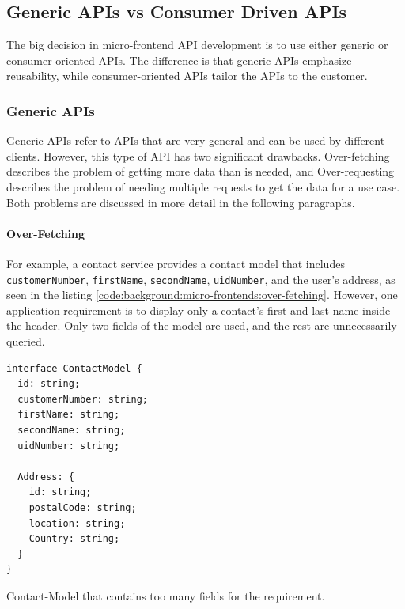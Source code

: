 \subsection{Generic APIs vs Consumer Driven APIs}\label{subsection:background:micro-frontend:generic-vs-consumer-driven-apis}

The big decision in micro-frontend \ac{API} development is to use either generic or consumer-oriented \acp{API}. The difference is that generic \acp{API} emphasize reusability, while consumer-oriented \acp{API} tailor the \acp{API} to the customer.

\subsubsection{Generic \acp{API}}\label{subsubsection:background:micro-frontend:generic-vs-consumer-driven-apis:generic-apis}

Generic \acp{API} refer to \acp{API} that are very general and can be used by different clients. However, this type of \ac{API} has two significant drawbacks. Over-fetching describes the problem of getting more data than is needed, and Over-requesting describes the problem of needing multiple requests to get the data for a use case. Both problems are discussed in more detail in the following paragraphs. \cite{misc:2019:leitner:background:micro-frontends:backend-for-frontends}

\paragraph{Over-Fetching}\label{paragraph:background:micro-frontend:generic-vs-consumer-driven-apis:generic-apis:over-fetching}


For example, a contact service provides a contact model that includes \texttt{customerNumber}, \texttt{firstName}, \texttt{secondName}, \texttt{uidNumber}, and the user's address, as seen in the listing \ref{code:background:micro-frontends:over-fetching}. However, one application requirement is to display only a contact's first and last name inside the header. Only two fields of the model are used, and the rest are unnecessarily queried. \cite{misc:2019:leitner:background:micro-frontends:backend-for-frontends}

\ifshowListings
\begin{listing}[H]
    \begin{verbatim}
interface ContactModel {
  id: string;
  customerNumber: string;
  firstName: string;
  secondName: string;
  uidNumber: string;

  Address: {
    id: string;
    postalCode: string;
    location: string;
    Country: string;
  }
}
    \end{verbatim}
    \caption{Contact-Model that contains too many fields for the requirement.}\label{code:background:micro-frontends:over-fetching}
\end{listing}
\fi

